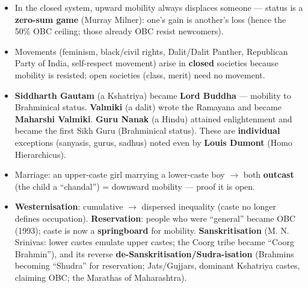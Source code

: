 \begin{KeyConcept}
\begin{itemize}
    \item In the closed system, upward mobility always displaces someone --- status is a \textbf{zero-sum game} (Murray Milner): one's gain is another's loss (hence the 50\% OBC ceiling; those already OBC resist newcomers).
\end{itemize}
\end{KeyConcept}

\begin{KeyConcept}
\begin{itemize}
    \item Movements (feminism, black/civil rights, Dalit/Dalit Panther, Republican Party of India, self-respect movement) arise in \textbf{closed} societies because mobility is resisted; open societies (class, merit) need no movement.
\end{itemize}
\end{KeyConcept}

\begin{CriticalPoint}
\begin{itemize}
    \item \textbf{Siddharth Gautam} (a Kshatriya) became \textbf{Lord Buddha} --- mobility to Brahminical status. \textbf{Valmiki} (a dalit) wrote the Ramayana and became \textbf{Maharshi Valmiki}. \textbf{Guru Nanak} (a Hindu) attained enlightenment and became the first Sikh Guru (Brahminical status). These are \textbf{individual} exceptions (sanyasis, gurus, sadhus) noted even by \textbf{Louis Dumont} (Homo Hierarchicus).
    \item Marriage: an upper-caste girl marrying a lower-caste boy $\rightarrow$ both \textbf{outcast} (the child a ``chandal'') = downward mobility --- proof it is open.
    \item \textbf{Westernisation}: cumulative $\rightarrow$ dispersed inequality (caste no longer defines occupation). \textbf{Reservation}: people who were ``general'' became OBC (1993); caste is now a \textbf{springboard} for mobility. \textbf{Sanskritisation} (M. N. Srinivas: lower castes emulate upper castes; the Coorg tribe became ``Coorg Brahmin''), and its reverse \textbf{de-Sanskritisation/Sudra-isation} (Brahmins becoming ``Shudra'' for reservation; Jats/Gujjars, dominant Kshatriya castes, claiming OBC; the Marathas of Maharashtra).
\end{itemize}
\end{CriticalPoint}

